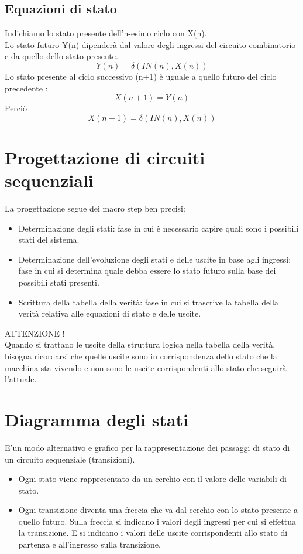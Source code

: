 \documentclass[a4paper]{book}
\begin{document}
\subsection{Equazioni di stato}

Indichiamo lo stato presente dell'n-esimo ciclo con X(n).\\
Lo stato futuro Y(n) dipenderà dal valore degli ingressi del circuito combinatorio e da quello dello stato presente.
\[Y(n)=\delta(IN(n), X(n))\]
Lo stato presente al ciclo successivo (n+1) è uguale a quello futuro del ciclo precedente :
\[X(n+1)=Y(n)\]
Perciò \[X(n+1)=\delta( IN(n), X(n))\]


\section{Progettazione di circuiti sequenziali}

La progettazione segue dei macro step ben precisi:

\begin{itemize}
\item{Determinazione degli stati}: fase in cui è necessario capire quali sono i possibili stati del sistema.
\item{Determinazione dell'evoluzione degli stati e delle uscite in base agli ingressi}: fase in cui si determina quale debba essere lo stato futuro sulla base dei possibili stati presenti.
\item{Scrittura della tabella della verità}: fase in cui si trascrive la tabella della verità relativa alle equazioni di stato e delle uscite.
\end{itemize}
ATTENZIONE !\\
Quando si trattano le uscite della struttura logica nella tabella della verità, bisogna ricordarsi che quelle uscite sono in corrispondenza dello stato che la macchina sta vivendo e non sono le uscite corrispondenti allo stato che seguirà l'attuale.



\section{Diagramma degli stati}

E'un modo alternativo e grafico per la rappresentazione dei passaggi di stato di un circuito sequenziale (transizioni).

\begin{itemize}
\item{}Ogni stato viene rappresentato da un cerchio con il valore delle variabili di stato.
\item{}Ogni transizione diventa una freccia che va dal cerchio con lo stato presente a quello futuro.
Sulla freccia si indicano i valori degli ingressi per cui si effettua la transizione.
E si indicano i valori delle uscite corrispondenti allo stato di partenza e all'ingresso sulla transizione.
\end{itemize}
\end{document}
